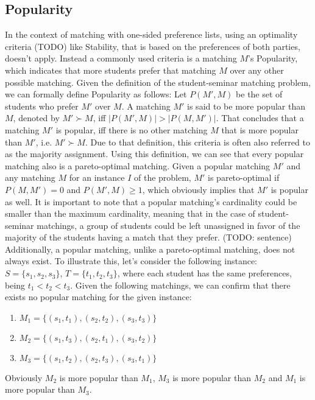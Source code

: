 \subsection{Popularity}
In the context of matching with one-sided preference lists, using an optimality criteria (TODO) like Stability, that is based on the preferences of both parties, doesn't apply. Instead a commonly used criteria is a matching $M$'s Popularity, which indicates that more students prefer that matching $M$ over any other possible matching.\cite{ManlovePopularMatchings} Given the definition of the student-seminar matching problem, we can formally define Popularity as follows:
Let $P(M', M)$ be the set of students who prefer $M'$ over $M$. A matching $M'$ is said to be more popular than $M$, denoted by $M' \succ M$, iff $|P(M', M)| > |P(M, M')|$. That concludes that a matching $M'$ is popular, iff there is no other matching $M$ that is more popular than $M'$, i.e. $M' \succ M$.\cite{Klaus, AbrahamPopular} Due to that definition, this criteria is often also referred to as the majority assignment.\cite{Gardenfors}
\newline
Using this definition, we can see that every popular matching also is a pareto-optimal matching. Given a popular matching $M'$ and any matching $M$ for an instance $I$ of the problem, $M'$ is pareto-optimal if $P(M, M') = 0$ and $P(M', M) \geq 1$, which obviously implies that $M'$ is popular as well.\cite{Klaus}
\newline
It is important to note that a popular matching's cardinality could be smaller than the maximum cardinality, meaning that in the case of student-seminar matchings, a group of students could be left unassigned in favor of the majority of the students having a match that they prefer. (TODO: sentence)
Additionally, a popular matching, unlike a pareto-optimal matching, does not always exist. To illustrate this, let's consider the following instance: $S=\{s_1, s_2, s_3\}$, $T=\{t_1, t_2, t_3\}$, where each student has the same preferences, being $t_1 < t_2 < t_3$. Given the following matchings, we can confirm that there exists no popular matching for the given instance: 
\begin{enumerate}
    \item $M_1=\{(s_1, t_1), (s_2, t_2), (s_3, t_3)\}$
    \item $M_2=\{(s_1, t_3), (s_2, t_1), (s_3, t_2)\}$
    \item $M_3=\{(s_1, t_2), (s_2, t_3), (s_3, t_1)\}$
\end{enumerate}
Obviously $M_2$ is more popular than $M_1$, $M_3$ is more popular than $M_2$ and $M_1$ is more popular than $M_3$.\cite{AbrahamPopular}

